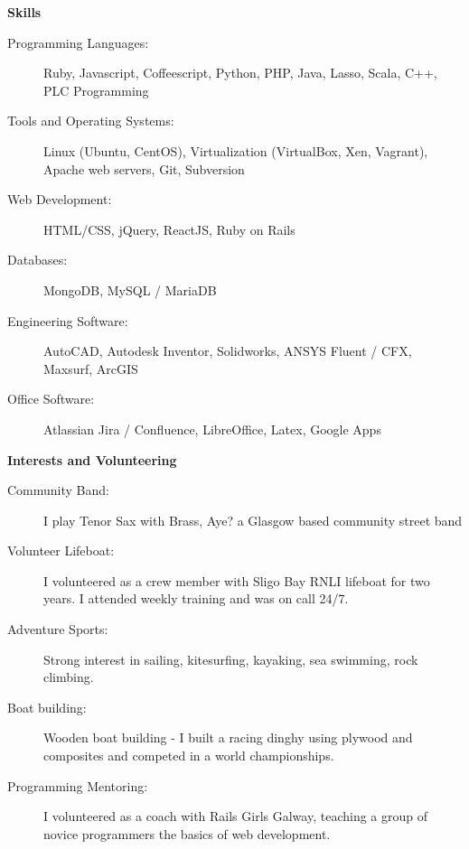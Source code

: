 \documentclass[letterpaper,11pt]{article}
\newcommand{\resheading}[1]{{\large \colorbox{mygrey}{\begin{minipage}{\textwidth}{\textbf{#1 \vphantom{p\^{E}}}}\end{minipage}}}}
\begin{document}
\resheading{Skills}
	\begin{description}
    \item[Programming Languages:] { \footnotesize Ruby, Javascript, Coffeescript, Python, PHP, Java, Lasso, Scala, C++, PLC Programming}
    \item[Tools and Operating Systems:] { \footnotesize Linux (Ubuntu, CentOS), Virtualization (VirtualBox, Xen, Vagrant), Apache web servers, Git, Subversion
    }
    \item[Web Development:] {\footnotesize HTML/CSS, jQuery, ReactJS, Ruby on Rails }
    \item[Databases:] {\footnotesize MongoDB, MySQL / MariaDB}
    \item[Engineering Software:]{\footnotesize AutoCAD, Autodesk Inventor, Solidworks, ANSYS Fluent / CFX, Maxsurf, ArcGIS}
    \item[Office Software:]{\footnotesize Atlassian Jira / Confluence, LibreOffice, Latex, Google Apps} 
	\end{description} %

\resheading{Interests and Volunteering}
	\begin{description}
		\item[Community Band:] I play Tenor Sax with Brass, Aye? a Glasgow based community street band
		\item[Volunteer Lifeboat:] I volunteered as a crew member with Sligo Bay RNLI lifeboat for two years. I attended weekly training and was on call 24/7.
		\item[Adventure Sports:] Strong interest in sailing, kitesurfing, kayaking, sea swimming, rock climbing.
		\item[Boat building:] Wooden boat building - I built a racing dinghy using plywood and composites and competed in a world championships.
		\item[Programming Mentoring:] I volunteered as a coach with Rails Girls Galway, teaching a group of novice programmers the basics of web development.

	\end{description} %
\end{document}
